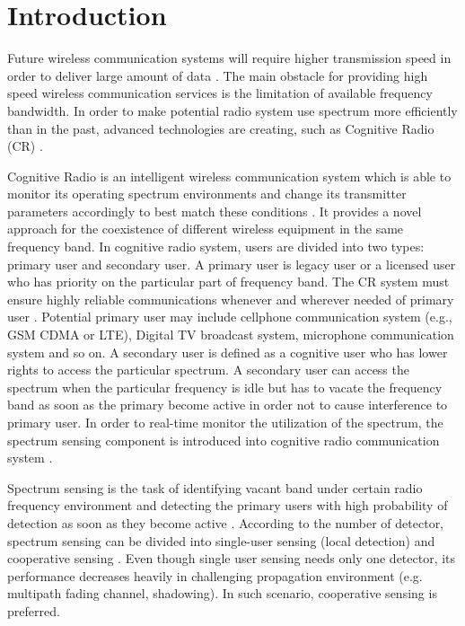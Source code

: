 \chapter{Introduction}
Future wireless communication systems will require higher transmission speed in order to deliver large amount of data \cite{pelcat20133gpp}. The main obstacle for providing high speed wireless communication services is the limitation of available frequency bandwidth. In order to make potential radio system use spectrum more efficiently than in the past, advanced technologies are creating, such as Cognitive Radio (CR) \cite{nonotice}. 

Cognitive Radio is an intelligent wireless communication system which is able to monitor its operating spectrum environments and change its transmitter parameters accordingly to best match these conditions \cite{wang2011advances} \cite{a001}. It provides a novel approach for the coexistence of different wireless equipment in the same frequency band. In cognitive radio system, users are divided into two types: primary user and secondary user. A primary user is legacy user or a licensed user who has priority on the particular part of frequency band. The CR system must ensure highly reliable communications whenever and wherever needed of primary user \cite{a001}. Potential primary user may include cellphone communication system (e.g., GSM CDMA or LTE), Digital TV broadcast system, microphone communication system and so on. A secondary user is defined as a cognitive user who has lower rights to access the particular spectrum. A secondary user can access the spectrum when the particular frequency is idle but has to vacate the frequency band as soon as the primary become active in order not to cause interference to primary user. 
In order to real-time monitor the utilization of the spectrum, the spectrum sensing component is introduced into cognitive radio communication system \cite{buddhikot2007understanding} \cite{tandra2009spectrum}.   

Spectrum sensing is the task of identifying vacant band under certain radio frequency environment and detecting the primary users with high probability of detection as soon as they become active \cite{umar2012spectrum}. According to the number of detector, spectrum sensing can be divided into single-user sensing (local detection) \cite{axell2010overview} \cite{wang2011advances} and cooperative sensing \cite{akyildiz2011cooperative}. Even though single user sensing needs only one detector, its performance decreases heavily in challenging propagation environment (e.g. multipath fading channel, shadowing). In such scenario, cooperative sensing is preferred.  

